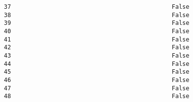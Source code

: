 \documentclass[11pt]{article}
\begin{document}
\begin{Verbatim}[commandchars=\\\{\}]
37                                              False               
38                                              False               
39                                              False               
40                                              False               
41                                              False               
42                                              False               
43                                              False               
44                                              False               
45                                              False               
46                                              False               
47                                              False               
48                                              False               


\end{Verbatim}
\end{document}
